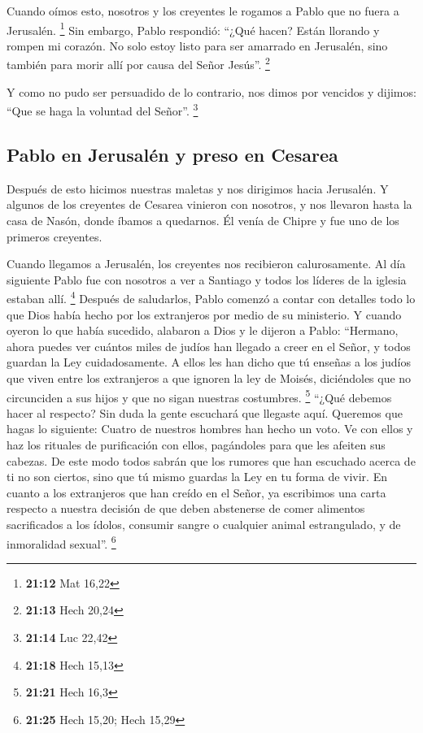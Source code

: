  Cuando oímos esto, nosotros y los creyentes le rogamos a
Pablo que no fuera a Jerusalén. \footnote{\textbf{21:12} Mat 16,22}
 Sin embargo, Pablo respondió: ``¿Qué hacen? Están
llorando y rompen mi corazón. No solo estoy listo para ser amarrado en
Jerusalén, sino también para morir allí por causa del Señor Jesús''.
\footnote{\textbf{21:13} Hech 20,24}

 Y como no pudo ser persuadido de lo contrario, nos dimos
por vencidos y dijimos: ``Que se haga la voluntad del Señor''.
\footnote{\textbf{21:14} Luc 22,42}

\hypertarget{pablo-en-jerusaluxe9n-y-preso-en-cesarea}{%
\subsection{Pablo en Jerusalén y preso en
Cesarea}\label{pablo-en-jerusaluxe9n-y-preso-en-cesarea}}

 Después de esto hicimos nuestras maletas y nos dirigimos
hacia Jerusalén.  Y algunos de los creyentes de Cesarea
vinieron con nosotros, y nos llevaron hasta la casa de Nasón, donde
íbamos a quedarnos. Él venía de Chipre y fue uno de los primeros
creyentes.

 Cuando llegamos a Jerusalén, los creyentes nos
recibieron calurosamente.  Al día siguiente Pablo fue con
nosotros a ver a Santiago y todos los líderes de la iglesia estaban
allí. \footnote{\textbf{21:18} Hech 15,13}  Después de
saludarlos, Pablo comenzó a contar con detalles todo lo que Dios había
hecho por los extranjeros por medio de su ministerio.  Y
cuando oyeron lo que había sucedido, alabaron a Dios y le dijeron a
Pablo: ``Hermano, ahora puedes ver cuántos miles de judíos han llegado a
creer en el Señor, y todos guardan la Ley cuidadosamente.
 A ellos les han dicho que tú enseñas a los judíos que
viven entre los extranjeros a que ignoren la ley de Moisés, diciéndoles
que no circunciden a sus hijos y que no sigan nuestras costumbres.
\footnote{\textbf{21:21} Hech 16,3}  ``¿Qué debemos hacer
al respecto? Sin duda la gente escuchará que llegaste aquí.
 Queremos que hagas lo siguiente: Cuatro de nuestros
hombres han hecho un voto.  Ve con ellos y haz los
rituales de purificación con ellos, pagándoles para que les afeiten sus
cabezas. De este modo todos sabrán que los rumores que han escuchado
acerca de ti no son ciertos, sino que tú mismo guardas la Ley en tu
forma de vivir.  En cuanto a los extranjeros que han
creído en el Señor, ya escribimos una carta respecto a nuestra decisión
de que deben abstenerse de comer alimentos sacrificados a los ídolos,
consumir sangre o cualquier animal estrangulado, y de inmoralidad
sexual''. \footnote{\textbf{21:25} Hech 15,20; Hech 15,29}

